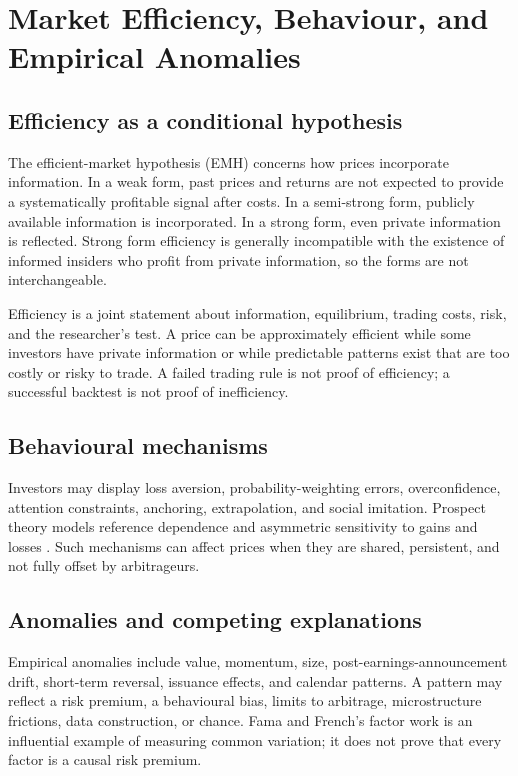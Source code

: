 \chapter{Market Efficiency, Behaviour, and Empirical Anomalies}

\section{Efficiency as a conditional hypothesis}
The efficient-market hypothesis (EMH) concerns how prices incorporate information. In a weak form, past prices and returns are not expected to provide a systematically profitable signal after costs. In a semi-strong form, publicly available information is incorporated. In a strong form, even private information is reflected. Strong form efficiency is generally incompatible with the existence of informed insiders who profit from private information, so the forms are not interchangeable.

Efficiency is a joint statement about information, equilibrium, trading costs, risk, and the researcher's test. A price can be approximately efficient while some investors have private information or while predictable patterns exist that are too costly or risky to trade. A failed trading rule is not proof of efficiency; a successful backtest is not proof of inefficiency.

\section{Behavioural mechanisms}
Investors may display loss aversion, probability-weighting errors, overconfidence, attention constraints, anchoring, extrapolation, and social imitation. Prospect theory models reference dependence and asymmetric sensitivity to gains and losses \cite{kahneman1979}. Such mechanisms can affect prices when they are shared, persistent, and not fully offset by arbitrageurs.

\section{Anomalies and competing explanations}
Empirical anomalies include value, momentum, size, post-earnings-announcement drift, short-term reversal, issuance effects, and calendar patterns. A pattern may reflect a risk premium, a behavioural bias, limits to arbitrage, microstructure frictions, data construction, or chance. Fama and French's factor work is an influential example of measuring common variation; it does not prove that every factor is a causal risk premium.

